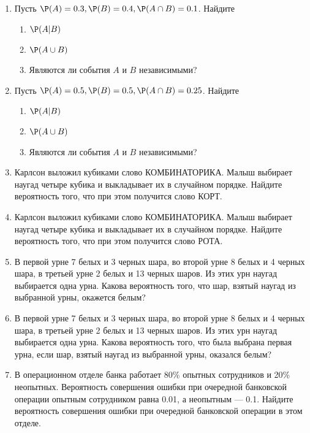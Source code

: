 \begin{enumerate}
\item  Пусть $\P(A) = 0.3, \P(B) = 0.4, \P(A\cap B) = 0.1 $. Найдите
	\begin{enumerate}
		\item  $\P(A|B)$
		\item  $\P(A\cup B)$
		\item  Являются ли события $A$ и $B$ независимыми?
	\end{enumerate}



\item  Пусть $\P(A) = 0.5, \P(B) = 0.5, \P(A\cap B) = 0.25 $. Найдите
\begin{enumerate}
	\item  $\P(A|B)$
	\item  $\P(A\cup B)$
	\item  Являются ли события $A$ и $B$ независимыми?
\end{enumerate}



\item  Карлсон выложил кубиками слово КОМБИНАТОРИКА. Малыш выбирает наугад четыре кубика и выкладывает их в случайном порядке.
Найдите вероятность того, что при этом получится слово КОРТ.


\item  Карлсон выложил кубиками слово КОМБИНАТОРИКА. Малыш выбирает наугад четыре кубика и выкладывает их в случайном порядке.
Найдите вероятность того, что при этом получится слово РОТА.

\item  В первой урне 7 белых и 3 черных шара, во второй урне 8 белых и 4 черных
шара, в третьей урне 2 белых и 13 черных шаров. Из этих урн наугад выбирается одна урна. Какова вероятность того, что шар, взятый наугад из выбранной урны, окажется белым?


\item  В первой урне 7 белых и 3 черных шара, во второй урне 8 белых и 4 черных
шара, в третьей урне 2 белых и 13 черных шаров. Из этих урн наугад выбирается одна урна. Какова вероятность того, что была выбрана первая урна, если шар, взятый наугад из выбранной урны, оказался белым?


\item  В операционном отделе банка работает 80\% опытных сотрудников и 20\%
неопытных. Вероятность совершения ошибки при очередной банковской операции
опытным сотрудником равна 0.01, а неопытным — 0.1. Найдите вероятность совершения ошибки при очередной банковской операции в этом отделе.



\end{enumerate}
